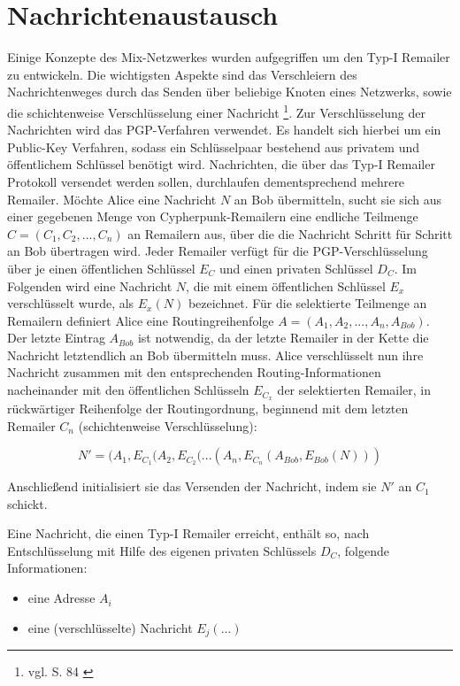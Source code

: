 \section{Nachrichtenaustausch}
Einige Konzepte des Mix-Netzwerkes wurden aufgegriffen um den Typ-I Remailer zu entwickeln. Die wichtigsten Aspekte sind das Verschleiern des Nachrichtenweges durch das Senden über beliebige Knoten eines Netzwerks, sowie die schichtenweise Verschlüsselung einer Nachricht \footnote{vgl. S. 84 \cite{sambleben2013informationstechnologie}}. Zur Verschlüsselung der Nachrichten wird das PGP-Verfahren verwendet. Es handelt sich hierbei um ein Public-Key Verfahren, sodass ein Schlüsselpaar bestehend aus privatem und öffentlichem Schlüssel benötigt wird.
Nachrichten, die über das Typ-I Remailer Protokoll versendet werden sollen, durchlaufen dementsprechend mehrere Remailer. Möchte Alice eine Nachricht \(N\) an Bob übermitteln, sucht sie sich aus einer gegebenen Menge von Cypherpunk-Remailern eine endliche Teilmenge \(C = (C_1, C_2, ..., C_n)\) an Remailern aus, über die die Nachricht Schritt für Schritt an Bob übertragen wird. Jeder Remailer verfügt für die PGP-Verschlüsselung über je einen öffentlichen Schlüssel \(E_C\) und einen privaten Schlüssel \(D_C\). Im Folgenden wird eine Nachricht \(N\), die mit einem öffentlichen Schlüssel \(E_x\) verschlüsselt wurde, als \(E_x(N)\) bezeichnet. Für die selektierte Teilmenge an Remailern definiert Alice eine Routingreihenfolge \(A = (A_1, A_2, ..., A_n, A_{Bob})\). Der letzte Eintrag \(A_{Bob}\) ist notwendig, da der letzte Remailer in der Kette die Nachricht letztendlich an Bob übermitteln muss.
Alice verschlüsselt nun ihre Nachricht zusammen mit den entsprechenden Routing-Informationen nacheinander mit den öffentlichen Schlüsseln \(E_{C_x}\) der selektierten Remailer, in rückwärtiger Reihenfolge der Routingordnung, beginnend mit dem letzten Remailer \(C_n\) (schichtenweise Verschlüsselung):

\begin{equation}
N' = (A_1, E_{C_1}(A_2, E_{C_2} (... (A_n,  E_{C_n}(A_{Bob}, E_{Bob}(N)))
\end{equation}

Anschließend initialisiert sie das Versenden der Nachricht, indem sie \(N'\) an \(C_1\) schickt.

Eine Nachricht, die einen Typ-I Remailer erreicht, enthält so, nach Entschlüsselung mit Hilfe des eigenen privaten Schlüssels \(D_C\), folgende Informationen:
\begin{itemize}
\item eine Adresse \(A_i\)
\item eine (verschlüsselte) Nachricht \(E_j(...)\)
\end{itemize}

